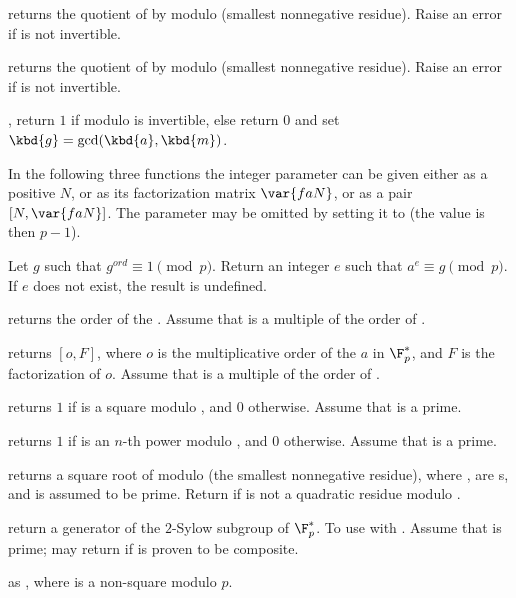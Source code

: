  returns the quotient of  by
 modulo  (smallest nonnegative residue). Raise an error if
 is not invertible.

 returns the quotient of  by
 modulo  (smallest nonnegative residue). Raise an error if
 is not invertible.

,  return $1$ if 
modulo  is invertible, else return $0$ and set
$\kbd{g} = \gcd(\kbd{a},\kbd{m})$.

In the following three functions the integer parameter  can be given
either as a positive  $N$, or as its factorization matrix $\var{faN}$,
 or as a pair $[N,\var{faN}]$. The parameter may be omitted by setting it to
 (the value is then $p-1$).

 Let $g$ such that
$g^{ord} \equiv 1 \pmod{p}$. Return an integer $e$ such that
$a^e \equiv g \pmod{p}$. If $e$ does not exist, the result is undefined.

 returns the order of the
 . Assume that  is a multiple of the order of
.

 returns $[o,F]$, where $o$
is the multiplicative order of the  $a$ in $\F_p^*$, and $F$ is the
factorization of $o$. Assume that  is a multiple of the order of
.

 returns $1$ if  is a square
modulo , and $0$ otherwise. Assume that  is a prime.

 returns $1$ if  is an
$n$-th power modulo , and $0$ otherwise. Assume that  is a prime.

 returns a square root of  modulo
 (the smallest nonnegative residue), where ,  are
s, and  is assumed to be prime. Return 
if  is not a quadratic residue modulo .

 return a generator of
the $2$-Sylow subgroup of $\F_p^*$. To use with .
Assume that  is prime; may return  if  is proven
to be composite.

 as , where  is a
non-square modulo $p$.

